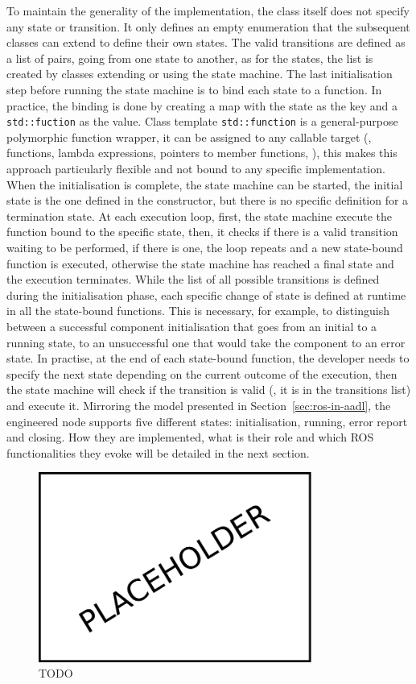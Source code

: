 To maintain the generality of the implementation, the class itself does not specify any state or transition. It only defines an empty enumeration that the subsequent classes can extend to define their own states. The valid transitions are defined as a list of pairs, going from one state to another, as for the states, the list is created by classes extending or using the state machine. The last initialisation step before running the state machine is to bind each state to a function. In practice, the binding is done by creating a map with the state as the key and a \texttt{std::fuction} as the value. Class template \texttt{std::function} is a general-purpose polymorphic function wrapper, it can be assigned to any callable target (\eg, functions, lambda expressions, pointers to member functions, \etc), this makes this approach particularly flexible and not bound to any specific implementation. When the initialisation is complete, the state machine can be started, the initial state is the one defined in the constructor, but there is no specific definition for a termination state. At each execution loop, first, the state machine execute the function bound to the specific state, then, it checks if there is a valid transition waiting to be performed, if there is one, the loop repeats and a new state-bound function is executed, otherwise the state machine has reached a final state and the execution terminates. While the list of all possible transitions is defined during the initialisation phase, each specific change of state is defined at runtime in all the state-bound functions. This is necessary, for example, to distinguish between a successful component initialisation that goes from an initial to a running state, to an unsuccessful one that would take the component to an error state. In practise, at the end of each state-bound function, the developer needs to specify the next state depending on the current outcome of the execution, then the state machine will check if the transition is valid (\ie, it is in the transitions list) and execute it. Mirroring the model presented in Section~\ref{sec:ros-in-aadl}, the engineered node supports five different states: initialisation, running, error report and closing. How they are implemented, what is their role and which ROS functionalities they evoke will be detailed in the next section.

\begin{figure}[t]
    \centering
    \includegraphics[width=0.8\textwidth]{gfx/placeholder}
    \caption{TODO}\label{fig:state-machine}
\end{figure}

